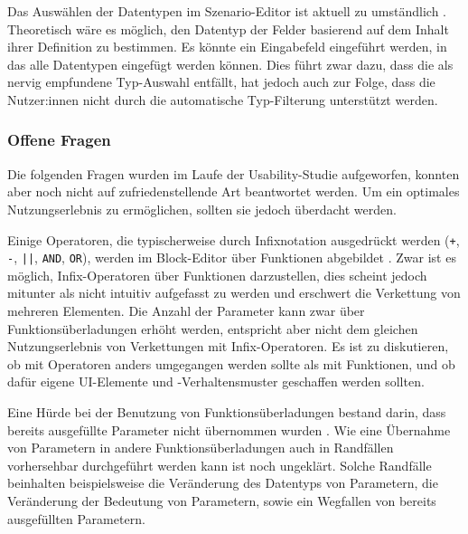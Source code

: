 Das Auswählen der Datentypen im Szenario-Editor ist aktuell zu umständlich . Theoretisch wäre es möglich, den Datentyp der Felder basierend auf dem Inhalt ihrer Definition zu bestimmen. Es könnte ein Eingabefeld eingeführt werden, in das alle Datentypen eingefügt werden können. Dies führt zwar dazu, dass die als nervig empfundene Typ-Auswahl entfällt, hat jedoch auch zur Folge, dass die Nutzer:innen nicht durch die automatische Typ-Filterung unterstützt werden.


\subsubsection{Offene Fragen}

Die folgenden Fragen wurden im Laufe der Usability-Studie aufgeworfen, konnten aber noch nicht auf zufriedenstellende Art beantwortet werden. Um ein optimales Nutzungserlebnis zu ermöglichen, sollten sie jedoch überdacht werden.

Einige Operatoren, die typischerweise durch Infixnotation ausgedrückt werden (\texttt{+}, \texttt{-}, \texttt{||}, \texttt{AND}, \texttt{OR}), werden im Block-Editor über Funktionen abgebildet . Zwar ist es möglich, Infix-Operatoren über Funktionen darzustellen, dies scheint jedoch mitunter als nicht intuitiv aufgefasst zu werden und erschwert die Verkettung von mehreren Elementen. Die Anzahl der Parameter kann zwar über Funktionsüberladungen erhöht werden, entspricht aber nicht dem gleichen Nutzungserlebnis von Verkettungen mit Infix-Operatoren. Es ist zu diskutieren, ob mit Operatoren anders umgegangen werden sollte als mit Funktionen, und ob dafür eigene UI-Elemente und -Verhaltensmuster geschaffen werden sollten.

Eine Hürde bei der Benutzung von Funktionsüberladungen bestand darin, dass bereits ausgefüllte Parameter nicht übernommen wurden . Wie eine Übernahme von Parametern in andere Funktionsüberladungen auch in Randfällen vorhersehbar durchgeführt werden kann ist noch ungeklärt. Solche Randfälle beinhalten beispielsweise die Veränderung des Datentyps von Parametern, die Veränderung der Bedeutung von Parametern, sowie ein Wegfallen von bereits ausgefüllten Parametern.

